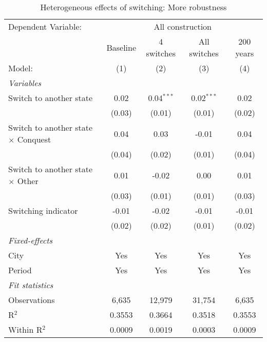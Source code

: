 \begin{table}[htbp]
   \caption{\label{tab:robustness_50y} Heterogeneous effects of switching: More robustness}
   \centering
   \begin{tabular}{lcccc}
      \tabularnewline \midrule \midrule
      Dependent Variable: & \multicolumn{4}{c}{All construction}\\
                                                 & Baseline & 4 switches   & All switches & 200 years \\   
      Model:                                     & (1)      & (2)          & (3)          & (4)\\  
      \midrule
      \emph{Variables}\\
      Switch to another state                    & 0.02     & 0.04$^{***}$ & 0.02$^{***}$ & 0.02\\   
                                                 & (0.03)   & (0.01)       & (0.01)       & (0.02)\\   
      Switch to another state $\times$ Conquest  & 0.04     & 0.03         & -0.01        & 0.04\\   
                                                 & (0.04)   & (0.02)       & (0.01)       & (0.04)\\   
      Switch to another state $\times$ Other     & 0.01     & -0.02        & 0.00         & 0.01\\   
                                                 & (0.03)   & (0.01)       & (0.01)       & (0.03)\\   
      Switching indicator                        & -0.01    & -0.02        & -0.01        & -0.01\\   
                                                 & (0.02)   & (0.02)       & (0.01)       & (0.02)\\   
      \midrule
      \emph{Fixed-effects}\\
      City                                       & Yes      & Yes          & Yes          & Yes\\  
      Period                                     & Yes      & Yes          & Yes          & Yes\\  
      \midrule
      \emph{Fit statistics}\\
      Observations                               & 6,635    & 12,979       & 31,754       & 6,635\\  
      R$^2$                                      & 0.3553   & 0.3664       & 0.3518       & 0.3553\\  
      Within R$^2$                               & 0.0009   & 0.0019       & 0.0003       & 0.0009\\  
      \midrule \midrule
      

\end{tabular}
\end{table}
